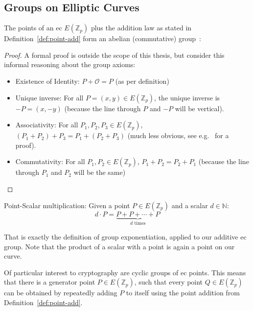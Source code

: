 \subsection{Groups on Elliptic Curves}
\begin{theorem}
    The points of an \gls{ec} $E(\mathbb{Z}_p)$ plus the addition law as stated in Definition~\ref{def:point-add} form an abelian (commutative) group~\cite{katz_introduction_2015, washington_elliptic_2008}:
\end{theorem}
\begin{proof}
    A formal proof is outside the scope of this thesis, but consider this informal reasoning about the group axioms:
    \begin{itemize}
        \item Existence of Identity: $P + \mathcal{O} = P$ (as per definition)
        \item Unique inverse: For all $P = (x,y) \in E(\mathbb{Z}_p)$, the unique inverse is $-P = (x, -y)$ (because the line through $P$ and $-P$ will be vertical).
        \item Associativity: For all $P_1, P_2, P_3 \in E(\mathbb{Z}_p)$, $(P_1 + P_2) + P_3 = P_1 + (P_2 + P_3)$ (much less obvious, see e.g.~\cite[chapter 2.4]{washington_elliptic_2008} for a proof).
        \item Commutativity: For all $P_1, P_2 \in E(\mathbb{Z}_p)$, $P_1 + P_2 = P_2 + P_1$ (because the line through $P_1$ and $P_2$ will be the same)
    \end{itemize}
\end{proof}

\begin{definition}
    Point-Scalar multiplication: Given a point $P \in E(\mathbb{Z}_p)$ and a scalar $d \in \mathbb{N}$: 
    \begin{equation}
        d \cdot P = \underbrace{P + P + \cdots + P}_{d \text{ times}}
    \end{equation}
\end{definition}
 
That is exactly the definition of group exponentiation, applied to our additive \gls{ec} group.
Note that the product of a scalar with a point is again a point on our curve.

Of particular interest to cryptography are cyclic groups of \gls{ec} points.
This means that there is a generator point $P \in E(\mathbb{Z}_p)$, such that every point $Q \in E(\mathbb{Z}_p)$ can be obtained by repeatedly adding $P$ to itself using the point addition from Definition~\ref{def:point-add}.

